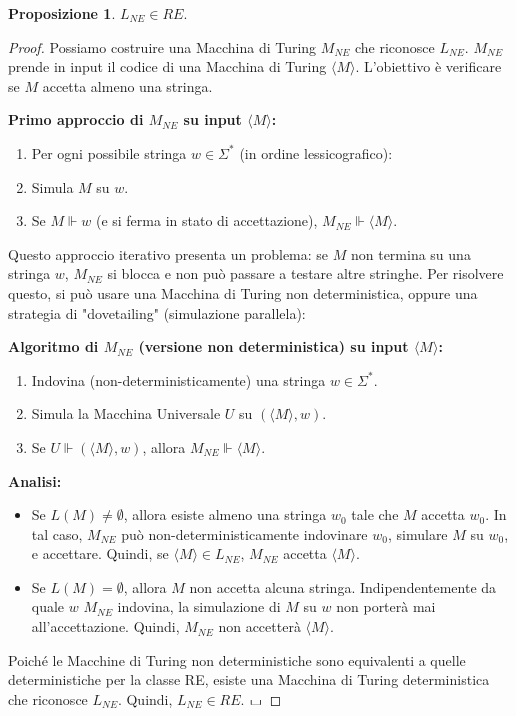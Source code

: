 \documentclass[a4paper]{article}
\newcommand{\blankS}{\ensuremath{\raisebox{-0.15ex}{\scalebox{1.3}[0.7]{$\sqcup$}}}}
\theoremstyle{definition} %
\newtheorem{proposition}[theorem]{Proposizione}
\begin{document}
\begin{proposition}
$L_{NE} \in RE$.
\end{proposition}
\begin{proof}
Possiamo costruire una Macchina di Turing $M_{NE}$ che riconosce $L_{NE}$. $M_{NE}$ prende in input il codice di una Macchina di Turing $\langle M \rangle$. L'obiettivo è verificare se $M$ accetta almeno una stringa.

\textbf{Primo approccio di $M_{NE}$ su input $\langle M \rangle$:}
\begin{enumerate}
    \item Per ogni possibile stringa $w \in \Sigma^*$ (in ordine lessicografico):
    \item Simula $M$ su $w$.
    \item Se $M \Vdash w$ (e si ferma in stato di accettazione), $M_{NE} \Vdash \langle M \rangle$.
\end{enumerate}

Questo approccio iterativo presenta un problema: se $M$ non termina su una stringa $w$, $M_{NE}$ si blocca e non può passare a testare altre stringhe.
Per risolvere questo, si può usare una Macchina di Turing non deterministica, oppure una strategia di "dovetailing" (simulazione parallela):

\textbf{Algoritmo di $M_{NE}$ (versione non deterministica) su input $\langle M \rangle$:}
\begin{enumerate}
    \item Indovina (non-deterministicamente) una stringa $w \in \Sigma^*$.
    \item Simula la Macchina Universale $U$ su $(\langle M \rangle, w)$.
    \item Se $U \Vdash (\langle M \rangle, w)$, allora $M_{NE} \Vdash \langle M \rangle$.
\end{enumerate}

\textbf{Analisi:}
\begin{itemize}
    \item Se $L(M) \neq \emptyset$, allora esiste almeno una stringa $w_0$ tale che $M$ accetta $w_0$. In tal caso, $M_{NE}$ può non-deterministicamente indovinare $w_0$, simulare $M$ su $w_0$, e accettare. Quindi, se $\langle M \rangle \in L_{NE}$, $M_{NE}$ accetta $\langle M \rangle$.
    \item Se $L(M) = \emptyset$, allora $M$ non accetta alcuna stringa. Indipendentemente da quale $w$ $M_{NE}$ indovina, la simulazione di $M$ su $w$ non porterà mai all'accettazione. Quindi, $M_{NE}$ non accetterà $\langle M \rangle$.
\end{itemize}
Poiché le Macchine di Turing non deterministiche sono equivalenti a quelle deterministiche per la classe RE, esiste una Macchina di Turing deterministica che riconosce $L_{NE}$. Quindi, $L_{NE} \in RE$.
$\blankS$
\end{proof}
\end{document}
